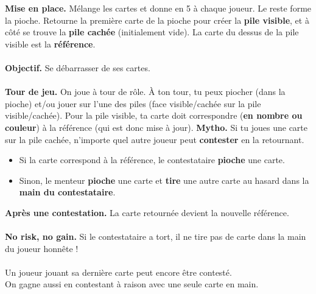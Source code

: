 \documentclass[a4paper]{memoir}
\begin{document}
{\footnotesize

\noindent
\textbf{ Mise en place.} Mélange les cartes et donne en 5 à chaque joueur. 
Le reste forme la pioche.
Retourne la première carte de la pioche pour créer la \textbf{pile visible}, et à côté se trouve la \textbf{pile cachée} (initialement vide). 
La carte du dessus de la pile visible est la \textbf{référence}.
\\
\\
\noindent
\textbf{ Objectif.} Se débarrasser de ses cartes.
\\
\\
\noindent
\textbf{ Tour de jeu.} On joue à tour de rôle. 
À ton tour, tu peux piocher (dans la pioche) et/ou jouer sur l’une des piles (face visible/cachée sur la pile visible/cachée).
Pour la pile visible, ta carte doit correspondre (\textbf{en nombre ou couleur}) à la référence (qui est donc mise à jour).
\newpage
\noindent
\textbf{ Mytho.} Si tu joues une carte sur la pile cachée, n’importe quel autre joueur peut \textbf{contester} en la retournant.
\begin{itemize}
\item Si la carte correspond à la référence, le contestataire \textbf{pioche} une carte.
\item Sinon, le menteur \textbf{pioche} une carte et \textbf{tire} une autre carte au hasard dans la \textbf{main du contestataire}.
\end{itemize}
\textbf{ Après une contestation.} La carte retournée devient la nouvelle référence.
\\
\\
\textbf{ No risk, no gain.} Si le contestataire a tort, il ne tire pas de carte dans la main du joueur honnête !
\\
\\
\noindent
{} Un joueur jouant sa dernière carte peut encore être contesté.
\\
\noindent
{} On gagne aussi en contestant à raison avec une seule carte en main.
}
\end{document}
